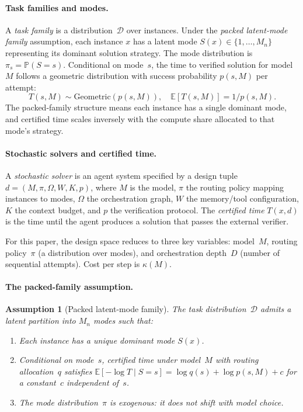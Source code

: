 \documentclass[twoside,11pt]{article}
\newtheorem{assumption}[theorem]{Assumption}
\newcommand{\E}{\mathbb{E}}
\newcommand{\Prb}{\mathbb{P}}
\newcommand{\cD}{\mathcal{D}}
\newcommand{\Mn}{M_n}
\begin{document}
\paragraph{Task families and modes.}
A \emph{task family} is a distribution~$\cD$ over instances.
Under the \emph{packed latent-mode family} assumption, each instance $x$ has a latent mode $S(x) \in \{1, \ldots, \Mn\}$ representing its dominant solution strategy.
The mode distribution is $\pi_s = \Prb(S = s)$.
Conditional on mode~$s$, the time to verified solution for model~$M$ follows a geometric distribution with success probability $p(s, M)$ per attempt:
\begin{equation}
\label{eq:geometric-trials}
  T(s, M) \sim \mathrm{Geometric}(p(s, M)), \quad \E[T(s,M)] = 1/p(s,M).
\end{equation}
The packed-family structure means each instance has a single dominant mode, and certified time scales inversely with the compute share allocated to that mode's strategy.

\paragraph{Stochastic solvers and certified time.}
A \emph{stochastic solver} is an agent system specified by a design tuple $d = (M, \pi, \Omega, W, K, p)$, where $M$ is the model, $\pi$ the routing policy mapping instances to modes, $\Omega$ the orchestration graph, $W$ the memory/tool configuration, $K$ the context budget, and $p$ the verification protocol.
The \emph{certified time} $T(x, d)$ is the time until the agent produces a solution that passes the external verifier.

For this paper, the design space reduces to three key variables: model~$M$, routing policy~$\pi$ (a distribution over modes), and orchestration depth~$D$ (number of sequential attempts).
Cost per step is $\kappa(M)$.

\paragraph{The packed-family assumption.}
\begin{assumption}[Packed latent-mode family]
\label{ass:packed-family}
The task distribution~$\cD$ admits a latent partition into $\Mn$ modes such that:
\begin{enumerate}[label=(\roman*)]
  \item Each instance has a unique dominant mode $S(x)$.
  \item Conditional on mode~$s$, certified time under model~$M$ with routing allocation~$q$ satisfies $\E[-\log T \mid S = s] = \log q(s) + \log p(s, M) + c$ for a constant~$c$ independent of~$s$.
  \item The mode distribution~$\pi$ is exogenous: it does not shift with model choice.
\end{enumerate}
\end{assumption}
\end{document}
